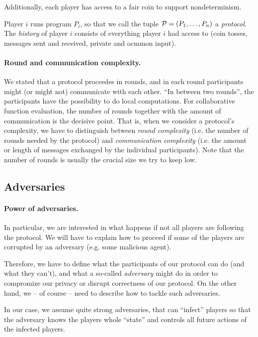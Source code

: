 \message{ !name(seminar.tex)}\documentclass{llncs}
\begin{document}
Additionally, each player has access to a fair coin to support nondeterminism.

Player $i$ runs program $P_i$, so that we call the tuple ${\cal P}=(P_1,\dots,P_n)$ a \emph{protocol}. The \emph{history} of player $i$ consists of everything player $i$ had access to (coin tosses, messages sent and received, private and ocmmon input).

\paragraph{Round and communication complexity.}

We stated that a protocol proceedes in rounds, and in each round participants might (or might not) communicate with each other. ``In between two rounds'', the participants have the possibility to do local computations. For collaborative function evaluation, the number of rounds together with the amount of communication is the decisive point. That is, when we consider a protocol's complexity, we have to distinguish between \emph{round complexity} (i.e. the number of rounds needed by the protocol) and \emph{communication complexity} (i.e. the amount or length of messages exchanged by the individual participants). Note that the number of rounds is usually the crucial size we try to keep low.

\subsection{Adversaries}
\label{sec:adversaries-more-detail}

\paragraph{Power of adversaries.}

In particular, we are interested in what happens if not all players are following the protocol. We will have to explain how to proceed if some of the players are corrupted by an adversary (e.g. some malicious agent).

Therefore, we have to define what the participants of our protocol can do (and what they can't), and what a so-called \emph{adversary} might do in order to compromize our privacy or disrupt correctness of our protocol. On the other hand, we -- of course -- need to describe how to tackle such adversaries.

In our case, we assume quite strong adversaries, that can ``infect'' players so that the adversary knows the players whole ``state'' and controls all future actions of the infected players. 
\end{document}
